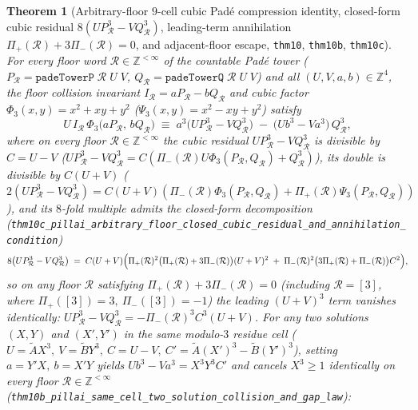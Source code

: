 \documentclass[11pt,a4paper]{article}
\theoremstyle{plain}
\newtheorem{theorem}{Theorem}[section]
\theoremstyle{definition}
\begin{document}
\begin{theorem}[Arbitrary-floor $9$-cell cubic Pad\'e compression identity, closed-form cubic residual $8(U P_{\mathcal{R}}^3 - V Q_{\mathcal{R}}^3)$, leading-term annihilation $\Pi_+(\mathcal{R})+3\Pi_-(\mathcal{R})=0$, and adjacent-floor escape, \texttt{thm10}, \texttt{thm10b}, \texttt{thm10c}]
\label{thm:main-10}
For every floor word $\mathcal{R}\in\mathbb{Z}^{<\infty}$ of the countable Pad\'e tower ($P_{\mathcal{R}} = \texttt{padeTowerP}\;\mathcal{R}\;U\;V$, $Q_{\mathcal{R}} = \texttt{padeTowerQ}\;\mathcal{R}\;U\;V$) and all $(U,V,a,b)\in\mathbb{Z}^4$, the floor collision invariant $I_{\mathcal{R}} = a P_{\mathcal{R}} - b Q_{\mathcal{R}}$ and cubic factor $\Phi_3(x,y) = x^2 + xy + y^2$ ($\Psi_3(x,y) = x^2 - xy + y^2$) satisfy
\begin{equation}
  \label{eq:root-free-cubic-compression}
  U\,I_{\mathcal{R}}\,\Phi_3\bigl(a P_{\mathcal{R}},\,b Q_{\mathcal{R}}\bigr) \;\equiv\; a^3\bigl(U P_{\mathcal{R}}^3 - V Q_{\mathcal{R}}^3\bigr) \;-\; \bigl(U b^3 - V a^3\bigr)\,Q_{\mathcal{R}}^3,
\end{equation}
where on every floor $\mathcal{R}\in\mathbb{Z}^{<\infty}$ the cubic residual $U P_{\mathcal{R}}^3 - V Q_{\mathcal{R}}^3$ is divisible by $C = U - V$ ($U P_{\mathcal{R}}^3 - V Q_{\mathcal{R}}^3 = C(\Pi_-(\mathcal{R})U\Phi_3(P_{\mathcal{R}},Q_{\mathcal{R}}) + Q_{\mathcal{R}}^3)$), its double is divisible by $C(U+V)$ ($2(U P_{\mathcal{R}}^3 - V Q_{\mathcal{R}}^3) = C(U+V)(\Pi_-(\mathcal{R})\Phi_3(P_{\mathcal{R}},Q_{\mathcal{R}}) + \Pi_+(\mathcal{R})\Psi_3(P_{\mathcal{R}},Q_{\mathcal{R}}))$), and its $8$-fold multiple admits the closed-form decomposition (\texttt{thm10c\_pillai\_arbitrary\_floor\_closed\_cubic\_residual\_and\_annihilation\_condition})
\begin{equation}
  \label{eq:closed-form-cubic-residual-8x}
  8\bigl(U P_{\mathcal{R}}^3 - V Q_{\mathcal{R}}^3\bigr)
  \;=\; C(U+V)\Bigl(\Pi_+(\mathcal{R})^2\bigl(\Pi_+(\mathcal{R})+3\Pi_-(\mathcal{R})\bigr)(U+V)^2
  \;+\; \Pi_-(\mathcal{R})^2\bigl(3\Pi_+(\mathcal{R})+\Pi_-(\mathcal{R})\bigr)C^2\Bigr),
\end{equation}
so on any floor $\mathcal{R}$ satisfying $\Pi_+(\mathcal{R}) + 3\Pi_-(\mathcal{R}) = 0$ (including $\mathcal{R}=[3]$, where $\Pi_+([3])=3,\ \Pi_-([3])=-1$) the leading $(U+V)^3$ term vanishes identically: $U P_{\mathcal{R}}^3 - V Q_{\mathcal{R}}^3 = -\Pi_-(\mathcal{R})^3 C^3(U+V)$. For any two solutions $(X,Y)$ and $(X',Y')$ in the same modulo-$3$ residue cell ($U = \widetilde{A}X^3,\ V = \widetilde{B}Y^3,\ C = U-V,\ C' = \widetilde{A}(X')^3 - \widetilde{B}(Y')^3$), setting $a = Y'X,\ b = X'Y$ yields $U b^3 - V a^3 = X^3 Y^3 C'$ and cancels $X^3 \ge 1$ identically on every floor $\mathcal{R}\in\mathbb{Z}^{<\infty}$ (\texttt{thm10b\_pillai\_same\_cell\_two\_solution\_collision\_and\_gap\_law}):

\end{theorem}
\end{document}
